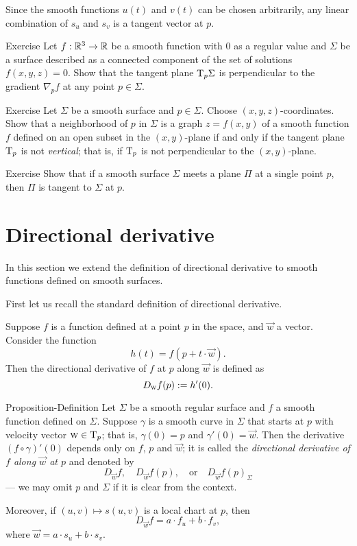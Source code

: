 Since the smooth functions $u(t)$ and $v(t)$ can be chosen arbitrarily, any linear combination of $s_u$ and $s_v$ is a tangent vector at $p$. 
\qeds


\begin{thm}{Exercise}\label{ex:tangent-normal}
Let $f:\mathbb{R}^3\to\mathbb{R}$ be a smooth function with $0$ as a regular value and $\Sigma$ be a surface described as a connected component of the set of solutions $f(x,y,z)=0$.
Show that the tangent plane $\mathrm{T}_p\Sigma$ is perpendicular to the gradient $\nabla_pf$ at any point $p\in\Sigma$.
\end{thm}

\begin{thm}{Exercise}\label{ex:vertical-tangent}
Let $\Sigma$ be a smooth surface and $p\in\Sigma$.
Choose $(x,y,z)$-coordinates.
Show that a neighborhood of $p$ in $\Sigma$ is a graph $z=f(x,y)$ of a smooth function $f$ defined on an open subset in the $(x,y)$-plane if and only if the tangent plane $\mathrm{T}_p$ is not {}\emph{vertical}; that is, if $\mathrm{T}_p$ is not perpendicular to the $(x,y)$-plane.
\end{thm}

\begin{thm}{Exercise}\label{ex:tangent-single-point}
Show that if a smooth surface $\Sigma$ meets a plane $\Pi$ at a single point $p$, then $\Pi$ is tangent to $\Sigma$ at $p$.
\end{thm}


\section{Directional derivative}

In this section we extend the definition of directional derivative to smooth functions defined on smooth surfaces.

First let us recall the standard definition of directional derivative.

Suppose $f$ is a function defined at a point $p$ in the space, and $\vec w$ a vector.
Consider the function
\[h(t)=f(p+t\cdot\vec w).\]
Then the directional derivative of $f$ at $p$ along $\vec w$ is defined as 
\[D_{\text{\sc{w}}}f(p)\mathrel{:=} h'(0).\]

\begin{thm}{Proposition-Definition}\label{def:directional-derivative}
Let $\Sigma$ be a smooth regular surface and $f$ a smooth function defined on $\Sigma$. 
Suppose $\gamma$ is a smooth curve in $\Sigma$ that starts at $p$ with velocity vector $\text{\sc{w}}\in \mathrm{T}_p$;
that is, $\gamma(0)=p$ and $\gamma'(0)=\vec{w}$.
Then the derivative $(f\circ\gamma)'(0)$
depends only on $f$, $p$ and $\vec{w}$;
it is called the \emph{directional derivative of $f$ along $\vec{w}$ at $p$}
and denoted by
\[D_{\vec{w}}f,\quad D_{\vec{w}}f(p), \quad\text{or}\quad D_{\vec{w}}f(p)_\Sigma\] 
--- we may omit $p$ and $\Sigma$ if it is clear from the context.

Moreover, if $(u,v)\mapsto s(u,v)$ is a local chart at $p$, then 
\[D_{\vec{w}}f=a\cdot f_u+b\cdot f_v,\]
where $\vec{w}=a\cdot s_u +b\cdot s_v$. 
\end{thm}


